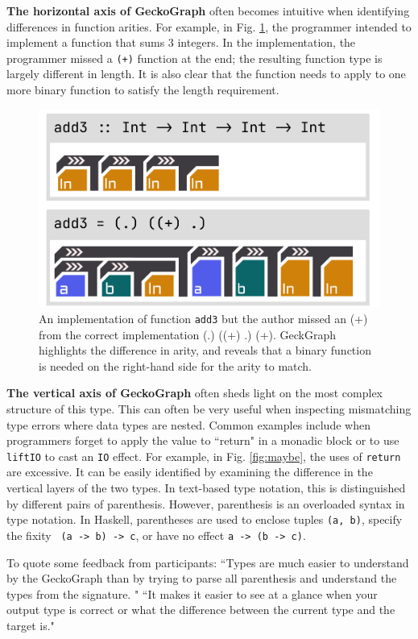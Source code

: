 \textbf{The horizontal axis of GeckoGraph} often becomes intuitive when identifying differences in function arities. For example, in Fig. \ref{fig:add3}, the programmer intended to implement a function that sums 3 integers. In the implementation, the programmer missed a \texttt{(+)} function at the end; the resulting function type is largely different in length. It is also clear that the function needs to apply to one more binary function to satisfy the length requirement.  

\begin{figure}[hbt]
  \includegraphics[width=0.6\linewidth]{figures/Add3}
  \caption[An implementation of function \texttt{add3} depicted in GeckoGraph]{\label{fig:add3} An implementation of function \texttt{add3} but the author missed an (+) from the correct implementation (.) ((+) .) (+). GeckGraph highlights the difference in arity, and reveals that a binary function is needed on the right-hand side for the arity to match. }
\end{figure}


\textbf{The vertical axis of GeckoGraph} often sheds light on the most complex structure of this type. This can often be very useful when inspecting mismatching type errors where data types are nested. Common examples include when programmers forget to apply the value to ``return" in a monadic block or to use \texttt{liftIO} to cast an \texttt{IO} effect. For example, in Fig. \ref{fig:maybe}, the uses of \texttt{return} are excessive. It can be easily identified by examining the difference in the vertical layers of the two types. In text-based type notation, this is distinguished by different pairs of parenthesis. However, parenthesis is an overloaded syntax in type notation. In Haskell, parentheses are used to enclose tuples \texttt{(a, b)}, specify the fixity \texttt{ (a -> b) -> c}, or have no effect \texttt{a -> (b -> c)}.

To quote some feedback from participants: ``Types are much easier to understand by the GeckoGraph than by trying to parse all parenthesis and understand the types from the signature. " ``It makes it easier to see at a glance when your output type is correct or what the difference between the current type and the target is."
	
